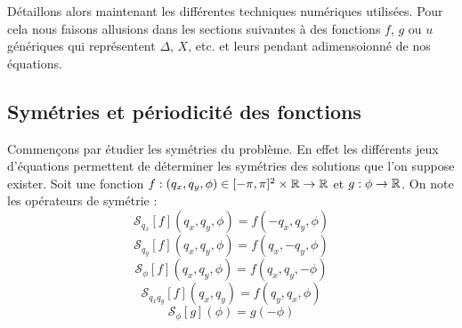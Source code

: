 \documentclass[10pt]{article}
\begin{document}
\begin{multicols}{2}
Détaillons alors maintenant les différentes techniques numériques utilisées. Pour cela nous faisons allusions dans les sections suivantes à des fonctions $f$, $g$ ou $u$ génériques qui représentent $\Delta$, $X$, etc. et leurs pendant adimensoionné de nos équations.

\vspace*{11pt}



\subsection{Symétries et périodicité des fonctions}


Commençons par étudier les symétries du problème. En effet les différents jeux d'équations permettent de déterminer les symétries des solutions que l'on suppose exister. Soit une fonction $ f : (q_x, q_y,\phi) \in [-\pi, \pi]^2 \times \mathbb{R} \to \mathbb{R}$ et $g : \phi \to \mathbb{R}$. On note les opérateurs de symétrie :
\begin{equation}
	\mathcal{S}_{q_x} [f](q_x, q_y, \phi) = f(-q_x, q_y, \phi)
\end{equation} 
\begin{equation}
	\mathcal{S}_{q_y} [f](q_x, q_y, \phi) = f(q_x, -q_y, \phi)
\end{equation} 
\begin{equation}
	\mathcal{S}_\phi [f](q_x, q_y, \phi) = f(q_x, q_y, -\phi)
\end{equation} 
\begin{equation}
	\mathcal{S}_{q_xq_y}[f](q_x, q_y) = f(q_y, q_x, \phi)
\end{equation}
\begin{equation}
\mathcal{S}_\phi [g](\phi) = g(-\phi)
\end{equation} 



\end{multicols}
\end{document}
